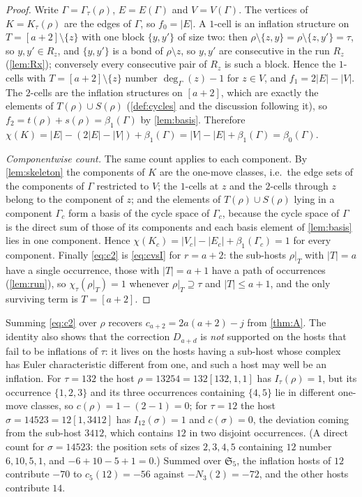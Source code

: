\documentclass[11pt,reqno]{amsart}
\theoremstyle{plain}
\theoremstyle{definition}
\theoremstyle{remark}
\newcommand{\Sym}{\mathfrak{S}}
\newcommand{\Gam}{\Gamma}
\newcommand{\bz}{\beta_0}
\newcommand{\bone}{\beta_1}
\begin{document}
\begin{proof}
Write $\Gam=\Gam_\tau(\rho)$, $E=E(\Gam)$ and $V=V(\Gam)$. The vertices of $K=K_\tau(\rho)$ are the edges of $\Gam$, so $f_0=|E|$. A $1$-cell is an inflation structure on $T=[a+2]\setminus\{z\}$ with one block $\{y,y'\}$ of size two: then $\rho\setminus\{z,y\}=\rho\setminus\{z,y'\}=\tau$, so $y,y'\in R_z$, and $\{y,y'\}$ is a bond of $\rho\setminus z$, so $y,y'$ are consecutive in the run $R_z$ (\cref{lem:Rx}); conversely every consecutive pair of $R_z$ is such a block. Hence the $1$-cells with $T=[a+2]\setminus\{z\}$ number $\deg_\Gam(z)-1$ for $z\in V$, and $f_1=2|E|-|V|$. The $2$-cells are the inflation structures on $[a+2]$, which are exactly the elements of $T(\rho)\cup S(\rho)$ (\cref{def:cycles} and the discussion following it), so $f_2=t(\rho)+s(\rho)=\bone(\Gam)$ by \cref{lem:basis}. Therefore $\chi(K)=|E|-(2|E|-|V|)+\bone(\Gam)=|V|-|E|+\bone(\Gam)=\bz(\Gam)$.


\emph{Componentwise count.} The same count applies to each component. By \cref{lem:skeleton} the components of $K$ are the one-move classes, i.e.\ the edge sets of the components of $\Gam$ restricted to $V$; the $1$-cells at $z$ and the $2$-cells through $z$ belong to the component of $z$; and the elements of $T(\rho)\cup S(\rho)$ lying in a component $\Gam_c$ form a basis of the cycle space of $\Gam_c$, because the cycle space of $\Gam$ is the direct sum of those of its components and each basis element of \cref{lem:basis} lies in one component. Hence $\chi(K_c)=|V_c|-|E_c|+\bone(\Gam_c)=1$ for every component. Finally \eqref{eq:c2} is \eqref{eq:cvsI} for $r=a+2$: the sub-hosts $\rho|_T$ with $|T|=a$ have a single occurrence, those with $|T|=a+1$ have a path of occurrences (\cref{lem:run}), so $\chi_\tau(\rho|_T)=1$ whenever $\rho|_T\supseteq\tau$ and $|T|\le a+1$, and the only surviving term is $T=[a+2]$.
\end{proof}

Summing \eqref{eq:c2} over $\rho$ recovers $c_{a+2}=2a(a+2)-j$ from \cref{thm:A}. The identity also shows that the correction $D_{a+d}$ is \emph{not} supported on the hosts that fail to be inflations of $\tau$: it lives on the hosts having a sub-host whose complex has Euler characteristic different from one, and such a host may well be an inflation. For $\tau=132$ the host $\rho=13254=132[132,1,1]$ has $I_\tau(\rho)=1$, but its occurrence $\{1,2,3\}$ and its three occurrences containing $\{4,5\}$ lie in different one-move classes, so $c(\rho)=1-(2-1)=0$; for $\tau=12$ the host $\sigma=14523=12[1,3412]$ has $I_{12}(\sigma)=1$ and $c(\sigma)=0$, the deviation coming from the sub-host $3412$, which contains $12$ in two disjoint occurrences. (A direct count for $\sigma=14523$: the position sets of sizes $2,3,4,5$ containing $12$ number $6,10,5,1$, and $-6+10-5+1=0$.) Summed over $\Sym_5$, the inflation hosts of $12$ contribute $-70$ to $c_5(12)=-56$ against $-N_3(2)=-72$, and the other hosts contribute $14$.
\end{document}
